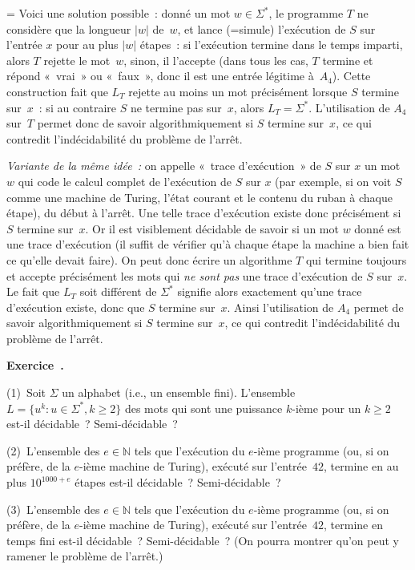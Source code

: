 \documentclass[12pt,a4paper]{article}
\theoremstyle{definition}
\newcommand\exercice{%
\refstepcounter{comcnt}\bigskip\noindent\textbf{Exercice~\thecomcnt.}}
\newif\ifcorrige
\newenvironment{corrige}%
{\ifcorrige\relax\else\setbox0=\vbox\bgroup\fi%
\smallbreak\footnotesize\noindent{\underbar{\textit{Corrigé.}}\quad}}
{{\hbox{}\nobreak\hfill\checkmark}%
\ifcorrige\relax\else\egroup\fi\par}
\begin{document}
\begin{corrige}
Voici une solution possible : donné un mot $w \in \Sigma^*$, le
programme $T$ ne considère que la longueur $|w|$ de $w$, et lance
(=simule) l'exécution de $S$ sur l'entrée $x$ pour au plus $|w|$
étapes : si l'exécution termine dans le temps imparti, alors $T$
rejette le mot $w$, sinon, il l'accepte (dans tous les cas, $T$
termine et répond « vrai » ou « faux », donc il est une entrée
légitime à $A_4$).  Cette construction fait que $L_T$ rejette au moins
un mot précisément lorsque $S$ termine sur $x$ : si au contraire $S$
ne termine pas sur $x$, alors $L_T = \Sigma^*$.  L'utilisation de
$A_4$ sur $T$ permet donc de savoir algorithmiquement si $S$ termine
sur $x$, ce qui contredit l'indécidabilité du problème de l'arrêt.

\textit{Variante de la même idée :} on appelle « trace d'exécution » de $S$ sur
$x$ un mot $w$ qui code le calcul complet de l'exécution de $S$ sur
$x$ (par exemple, si on voit $S$ comme une machine de Turing, l'état
courant et le contenu du ruban à chaque étape), du début à l'arrêt.
Une telle trace d'exécution existe donc précisément si $S$ termine
sur $x$.  Or il est visiblement décidable de savoir si un mot $w$
donné est une trace d'exécution (il suffit de vérifier qu'à chaque
étape la machine a bien fait ce qu'elle devait faire).  On peut donc
écrire un algorithme $T$ qui termine toujours et accepte précisément
les mots qui \emph{ne sont pas} une trace d'exécution de $S$ sur $x$.
Le fait que $L_T$ soit différent de $\Sigma^*$ signifie alors
exactement qu'une trace d'exécution existe, donc que $S$ termine
sur $x$.  Ainsi l'utilisation de $A_4$ permet de savoir
algorithmiquement si $S$ termine sur $x$, ce qui contredit
l'indécidabilité du problème de l'arrêt.
\end{corrige}

%

\exercice

(1) Soit $\Sigma$ un alphabet (i.e., un ensemble fini).  L'ensemble $L
= \{u^k : u\in\Sigma^*, k\geq 2\}$ des mots qui sont une puissance
$k$-ième pour un $k\geq 2$ est-il décidable ?  Semi-décidable ?

(2) L'ensemble des $e \in \mathbb{N}$ tels que l'exécution du $e$-ième
programme (ou, si on préfère, de la $e$-ième machine de Turing),
exécuté sur l'entrée $42$, termine en au plus $10^{1000+e}$ étapes
est-il décidable ?  Semi-décidable ?

(3) L'ensemble des $e \in \mathbb{N}$ tels que l'exécution du $e$-ième
programme (ou, si on préfère, de la $e$-ième machine de Turing),
exécuté sur l'entrée $42$, termine en temps fini est-il décidable ?
Semi-décidable ?  (On pourra montrer qu'on peut y ramener le problème
de l'arrêt.)
\end{document}
